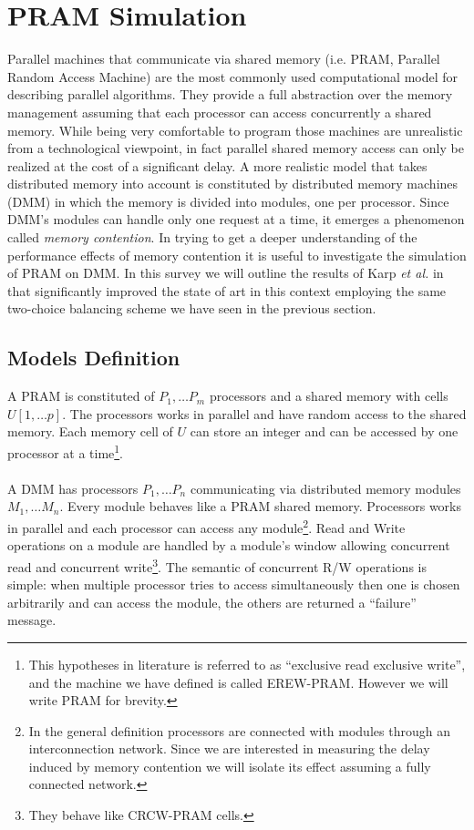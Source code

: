 \section{PRAM Simulation}

Parallel machines that communicate via shared memory
(i.e. PRAM, Parallel Random Access Machine) are the most
commonly used computational model for describing parallel algorithms.
They provide a full abstraction over the memory management assuming
that each processor can access concurrently a shared memory. While being
very comfortable to program those machines are unrealistic from a technological
viewpoint, in fact parallel shared memory access can only be realized at the
cost of a significant delay. A more realistic model that takes distributed
memory into account is constituted by distributed memory machines (DMM) in which
the memory is divided into modules, one per processor. Since DMM's modules can
handle only one request at a time, it emerges a phenomenon
called \textit{memory contention}.
In trying to get a deeper understanding of the performance
effects of memory contention it is useful to investigate the simulation of
 PRAM on DMM. In this survey we will outline the results of Karp {\em et al.} in
 \cite{Karp} that significantly improved the state of art in this context
 employing the same two-choice balancing scheme we have seen in the
 previous section.

 
\subsection{Models Definition}
  A PRAM is constituted of $P_1, \dots P_m$ processors
  and a shared memory with cells $U[1, \dots p]$. The processors
  works in parallel and have random access to the shared memory.
  Each memory cell of $U$ can store an integer and can be accessed
  by one processor at a time\footnote{This hypotheses in literature is referred
    to as ``exclusive read exclusive write'', and the machine we have defined
    is called EREW-PRAM. However we will write PRAM for brevity.}. \\
 \\
  A DMM has processors $P_1, \dots P_n$ communicating via distributed
  memory modules $M_1, \dots M_n$. Every module behaves like a PRAM
  shared memory. Processors works in parallel and each
  processor can access any module\footnote{In the general definition processors
    are connected with modules through an interconnection network. Since we are
    interested in measuring the delay induced by memory contention we will
    isolate its effect assuming a fully connected network.}.
  Read and Write operations on a module are handled by a module's window
  allowing concurrent read and concurrent write\footnote{They
    behave like CRCW-PRAM cells.}. The semantic of concurrent R/W operations
  is simple:
  when multiple processor tries to access simultaneously then one is chosen
  arbitrarily and can access the module, the others are returned a
  ``failure'' message. 

